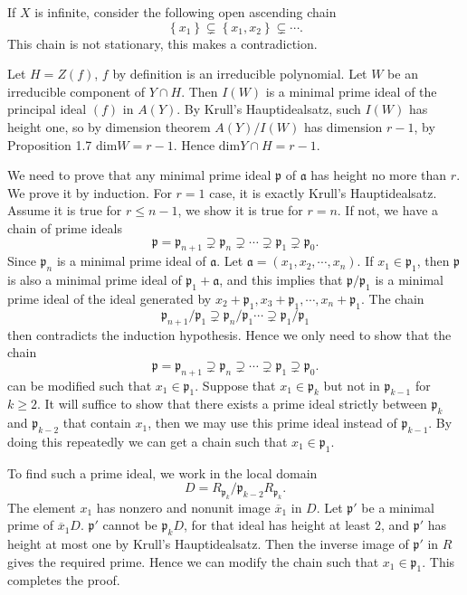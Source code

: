\begin{solution}
\begin{enumerate}
     If $X$ is infinite, consider the following open ascending chain
     \[
     \left\{x_1\right\} \subsetneq \left\{x_1,x_2\right\} \subsetneq\cdots.
     \] 
     This chain is not stationary, this makes a contradiction.
  \end{enumerate}
\end{solution}
\begin{solution}
  Let $H=Z(f)$, $f$ by definition is an irreducible polynomial. Let $W$ be an irreducible component of $Y\cap H$. Then $I(W)$ is a minimal prime ideal of the principal ideal $(f)$ in $A(Y)$. By Krull's Hauptidealsatz, such $I(W)$ has height one, so by dimension theorem $A(Y)/I(W)$ has dimension $r-1$, by Proposition 1.7 $\mathrm{dim}W=r-1$. Hence $\mathrm{dim}Y\cap H=r-1$.
\end{solution}
\begin{solution}
  We need to prove that any minimal prime ideal $\mathfrak{p}$ of $\mathfrak{a}$ has height no more than $r$. We prove it by induction. For $r=1$ case, it is exactly Krull's Hauptidealsatz. Assume it is true for  $r\le n-1$, we show it is true for  $r=n$. If not, we have a chain of prime ideals 
  \[
    \mathfrak{p}=\mathfrak{p}_{n+1}\supsetneq \mathfrak{p}_{n}\supsetneq \cdots\supsetneq\mathfrak{p}_1 \supsetneq \mathfrak{p}_0.
  \] 
  Since $\mathfrak{p}_n$ is a minimal prime ideal of $\mathfrak{a}$. Let  $\mathfrak{a}=(x_1,x_2,\cdots,x_n)$. If $x_1\in \mathfrak{p}_1$, then $\mathfrak{p}$ is also a minimal prime ideal of $\mathfrak{p}_1+\mathfrak{a}$, and this implies that $\mathfrak{p} / \mathfrak{p}_1$ is a minimal prime ideal of the ideal generated by $x_2+\mathfrak{p}_1,x_3+\mathfrak{p}_1,\cdots,x_n+\mathfrak{p}_1$. The chain 
  \[
  \mathfrak{p}_{n+1}/\mathfrak{p}_1\supsetneq \mathfrak{p}_n / \mathfrak{p}_1 \cdots\supsetneq \mathfrak{p}_1 / \mathfrak{p}_1
  \] 
  then contradicts the induction hypothesis. Hence we only need to show that the chain
\[
    \mathfrak{p}=\mathfrak{p}_{n+1}\supsetneq \mathfrak{p}_{n}\supsetneq \cdots\supsetneq\mathfrak{p}_1 \supsetneq \mathfrak{p}_0.
\]
can be modified such that $x_1\in \mathfrak{p}_1$. Suppose that $x_1\in \mathfrak{p}_k$ but not in $\mathfrak{p}_{k-1}$ for $k\ge 2$. It will suffice to show that there exists a prime ideal strictly between $\mathfrak{p}_{k}$ and $\mathfrak{p}_{k-2}$ that contain $x_1$, then we may use this prime ideal instead of $\mathfrak{p}_{k-1}$. By doing this repeatedly we can get a chain such that $x_1\in \mathfrak{p}_1$.

To find such a prime ideal, we work in the local domain
\[
D=R_{\mathfrak{p}_k} / \mathfrak{p}_{k-2}R_{\mathfrak{p}_k}.
\]
The element $x_1$ has nonzero and nonunit image $\overline{x}_1$ in $D$. Let $\mathfrak{p}'$ be a minimal prime of $\overline{x}_1 D$. $\mathfrak{p}'$ cannot be $\mathfrak{p}_k D$, for that ideal has height at least $2$, and $\mathfrak{p}'$ has height at most one by Krull's Hauptidealsatz. Then the inverse image of $\mathfrak{p}'$ in $R$ gives the required prime. Hence we can modify the chain such that $x_1\in \mathfrak{p}_1$. This completes the proof.
\end{solution}
